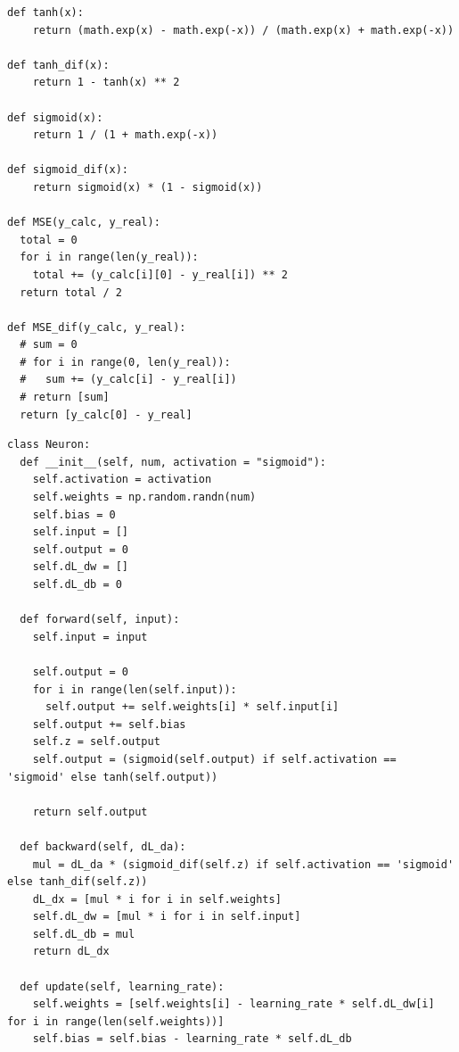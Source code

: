 \documentclass[12pt,a4paper]{article}
\begin{document}
\begin{lstlisting}[caption={Математические функции}, label={lst:code_example}]
def tanh(x):
    return (math.exp(x) - math.exp(-x)) / (math.exp(x) + math.exp(-x))

def tanh_dif(x):
    return 1 - tanh(x) ** 2

def sigmoid(x):
    return 1 / (1 + math.exp(-x))

def sigmoid_dif(x):
    return sigmoid(x) * (1 - sigmoid(x))

def MSE(y_calc, y_real):
  total = 0
  for i in range(len(y_real)):
    total += (y_calc[i][0] - y_real[i]) ** 2
  return total / 2

def MSE_dif(y_calc, y_real):
  # sum = 0
  # for i in range(0, len(y_real)):
  #   sum += (y_calc[i] - y_real[i])
  # return [sum]
  return [y_calc[0] - y_real]
\end{lstlisting}

\begin{lstlisting}[caption={Класс нейрона}, label={lst:code_example}]
class Neuron:
  def __init__(self, num, activation = "sigmoid"):
    self.activation = activation
    self.weights = np.random.randn(num)
    self.bias = 0
    self.input = []
    self.output = 0
    self.dL_dw = []
    self.dL_db = 0

  def forward(self, input):
    self.input = input

    self.output = 0
    for i in range(len(self.input)):
      self.output += self.weights[i] * self.input[i]
    self.output += self.bias
    self.z = self.output
    self.output = (sigmoid(self.output) if self.activation == 'sigmoid' else tanh(self.output))

    return self.output

  def backward(self, dL_da):
    mul = dL_da * (sigmoid_dif(self.z) if self.activation == 'sigmoid' else tanh_dif(self.z))
    dL_dx = [mul * i for i in self.weights]
    self.dL_dw = [mul * i for i in self.input]
    self.dL_db = mul
    return dL_dx

  def update(self, learning_rate):
    self.weights = [self.weights[i] - learning_rate * self.dL_dw[i] for i in range(len(self.weights))]
    self.bias = self.bias - learning_rate * self.dL_db

\end{lstlisting}
\end{document}
